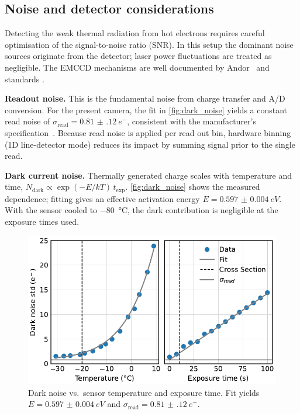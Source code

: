 \documentclass[
	parskip=half,
	a4paper,
]{scrarticle}
\begin{document}
\subsection{Noise and detector considerations}
Detecting the weak thermal radiation from hot electrons requires careful optimisation of the signal-to-noise ratio (SNR). In this setup the dominant noise sources originate from the detector; laser power fluctuations are treated as negligible. The EMCCD mechanisms are well documented by Andor~\cite{andor_establishing_nodate,dr_jo_walters_sensitivity_2023} and standards \cite{european_machine_vision_association_standard_2010}.

\textbf{Readout noise.}
This is the fundamental noise from charge transfer and A/D conversion. For the present camera, the fit in \autoref{fig:dark_noise} yields a constant read noise of
\(\sigma_{\text{read}}=\SI{0.81(12)}{e^{-}}\), consistent with the manufacturer’s specification~\cite{andor_ixonem_nodate}.
Because read noise is applied per read out bin, hardware binning (1D line-detector mode) reduces its impact by summing signal prior to the single read.

\textbf{Dark current noise.}
Thermally generated charge scales with temperature and time,
\(N_\text{dark}\propto \exp(-E/kT)\,t_\text{exp}\).
\autoref{fig:dark_noise} shows the measured dependence; fitting gives an effective activation energy \(E=\SI{0.597(4)}{eV}\).
With the sensor cooled to \SI{-80}{\degreeCelsius}, the dark contribution is negligible at the exposure times used.

\begin{figure}
    \centering
    \includegraphics{../analysis/figures/dark_noise.pdf}
    \caption{Dark noise vs.\ sensor temperature and exposure time. Fit yields \(E=\SI{0.597(4)}{eV}\) and \(\sigma_{\text{read}}=\SI{0.81(12)}{e^{-}}\).}
    \label{fig:dark_noise}
\end{figure}
\end{document}
